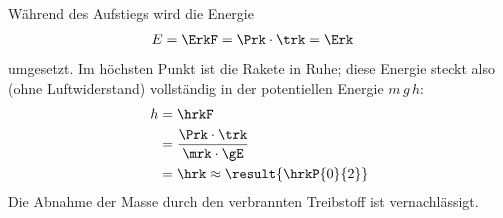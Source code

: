 Während des Aufstiegs wird die Energie
\begin{align}
 E &= \ErkF = \Prk\cdot\trk = \Erk
\end{align}
umgesetzt. Im höchsten Punkt ist die Rakete in Ruhe; diese Energie steckt also (ohne Luftwiderstand) vollständig in der potentiellen Energie $m\,g\,h$:
\begin{align}
 h &= \hrkF \\
   &= \frac{\Prk\cdot\trk}{\mrk\cdot\gE} \\
   &= \hrk \approx \result{\hrkP{0}{2}}
\end{align}
Die Abnahme der Masse durch den verbrannten Treibstoff ist vernachlässigt.
